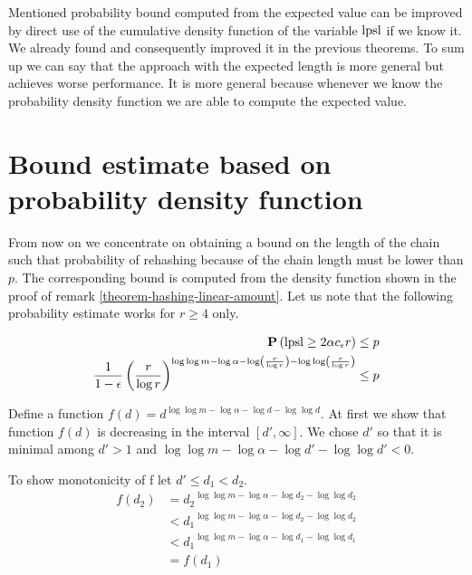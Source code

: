 Mentioned probability bound computed from the expected value can be improved by direct use of the cumulative density function of the variable $\mathrm{lpsl}$ if we know it. We already found and consequently improved it in the previous theorems. To sum up we can say that the approach with the expected length is more general but achieves worse performance. It is more general because whenever we know the probability density function we are able to compute the expected value.



















\section{Bound estimate based on probability density function}
\label{section-linear-systems-linear-amount-constant-estimate}
From now on we concentrate on obtaining a bound on the length of the chain such that probability of rehashing because of the chain length must be lower than $p$. The corresponding bound is computed from the density function shown in the proof of remark \ref{theorem-hashing-linear-amount}. Let us note that the following probability estimate works for $r \geq 4$ only. 

\[
\begin{split}
\mathbf{P}\left(\mathrm{lpsl} \geq 2\alpha c_\epsilon r\right) & \leq p \\ 
\frac{1}{1 - \epsilon}\left(\frac{r}{\log r}\right)^{\log \log m - \log \alpha - \log \left(\frac{r}{\log r}\right) - \log \log \left(\frac{r}{\log r}\right)} & \leq p \\
\end{split}
\]

Define a function $f(d) = d ^ {\log \log m - \log \alpha - \log d - \log \log d}$. At first we show that function $f(d)$ is decreasing in the interval $\left[ d', \infty \right]$. We chose $d'$ so that it is minimal among $d' > 1$ and $\log \log m - \log \alpha - \log d' - \log \log d' < 0$. 

To show monotonicity of f let $d' \leq d_1 < d_2$.
\[
\begin{split}
f(d_2) 
	& = {d_2} ^ {\log \log m - \log \alpha - \log d_2 - \log \log d_2} \\
	& < {d_1} ^ {\log \log m - \log \alpha - \log d_2 - \log \log d_2} \\
	& < {d_1} ^ {\log \log m - \log \alpha - \log d_1 - \log \log d_1} \\
	& = f(d_1) \\
\end{split}
\]

